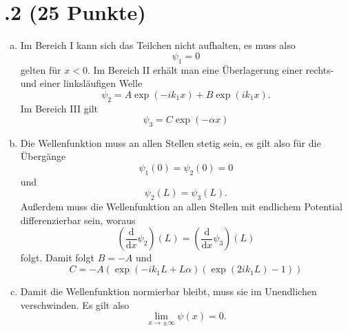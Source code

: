 \section*{\nr.2 \tittwo (25 Punkte)}
\begin{enumerate}[(a)]
\item Im Bereich I kann sich das Teilchen nicht aufhalten, es muss also
\begin{equation}
  \psi_1=0
\end{equation}
gelten für $x<0$. Im Bereich II erhält man eine Überlagerung einer rechts- und einer linksläufigen Welle
\begin{equation}
  \psi_2=A \exp\left(-ik_1x\right)+B\exp\left(ik_1x\right).
\end{equation}
Im Bereich III gilt
\begin{equation}
  \psi_3=C \exp\left(-\alpha x \right)
\end{equation}
\item Die Wellenfunktion muss an allen Stellen stetig sein, es gilt also für die Übergänge
\begin{equation}
  \psi_1(0)=\psi_2(0)=0
\end{equation}
und 
\begin{equation}
  \psi_2(L)=\psi_3(L).
\end{equation}
Außerdem muss die Wellenfunktion an allen Stellen mit endlichem Potential differenzierbar sein, woraus
\begin{equation}
  \left(\frac{\mathrm{d}}{\mathrm{d}x}\psi_2\right)\left(L\right)=\left(\frac{\mathrm{d}}{\mathrm{d}x}\psi_3\right)\left(L\right)
\end{equation}
folgt. Damit folgt $B=-A$ und 
\begin{equation}
  C=-A\left(\exp\left(-ik_1L+L\alpha\right)\left(\exp\left(2 i k_1 L\right)-1\right)\right)
\end{equation}
\item Damit die Wellenfunktion normierbar bleibt, muss sie im Unendlichen verschwinden. Es gilt also
\begin{equation}
  \lim_{x \to \pm \infty}\psi(x)=0.
\end{equation}
\end{enumerate}